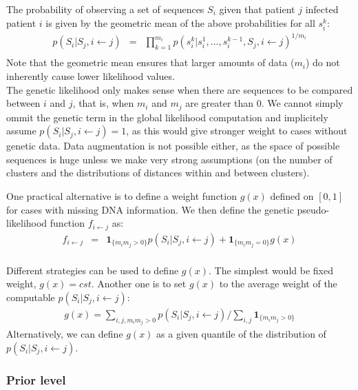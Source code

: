 \documentclass[10pt]{article}
\begin{document}
The probability of observing a set of sequences $S_i$ given that patient $j$ infected patient $i$ is given by the geometric mean of the above probabilities for all $s_i^k$:
\begin{eqnarray*}
p(S_i | S_j, i \leftarrow j) & = & \prod_{k=1}^{m_i} p(s_i^k | s_i^1, \ldots, s_i^{k-1}, S_j, i \leftarrow j)^{1/m_i} \\
\end{eqnarray*}
Note that the geometric mean ensures that larger amounts of data ($m_i$) do not inherently cause lower likelihood values.
\\

The genetic likelihood only makes sense when there are sequences to be compared between $i$ and $j$, that is, when $m_i$ and $m_j$ are greater than 0.
We cannot simply ommit the genetic term in the global likelihood computation and implicitely assume $p(S_i | S_j, i \leftarrow j) = 1$, as this would give stronger weight to cases without genetic data.
Data augmentation is not possible either, as the space of possible sequences is huge unless we make very strong assumptions (on the number of clusters and the distributions of distances within and between clusters).

One practical alternative is to define a weight function $g(x)$ defined on $\left[0,1\right]$ for cases with missing DNA information.
We then define the genetic pseudo-likelihood function $f_{i \leftarrow j} $ as:
\begin{eqnarray*}
f_{i \leftarrow j} & = & \mathbf{1}_{\{ m_i m_j > 0 \}} p(S_i | S_j, i \leftarrow j)
+ \mathbf{1}_{\{ m_i m_j = 0 \}} g(x)\\
\end{eqnarray*}

Different strategies can be used to define $g(x)$.
The simplest would be fixed weight, $g(x) = cst$.
Another one is to set $g(x)$ to the average weight of the computable $p(S_i | S_j, i \leftarrow j)$:
\begin{eqnarray*}
g(x) = \sum_{i,j,m_i m_j > 0} p(S_i | S_j, i \leftarrow j) / \sum_{i,j} \mathbf{1}_{\{m_i m_j > 0\}}
\end{eqnarray*}
Alternatively, we can define $g(x)$ as a given quantile of the distribution of $p(S_i | S_j, i \leftarrow j)$.



\subsubsection*{Prior level}
\end{document}
